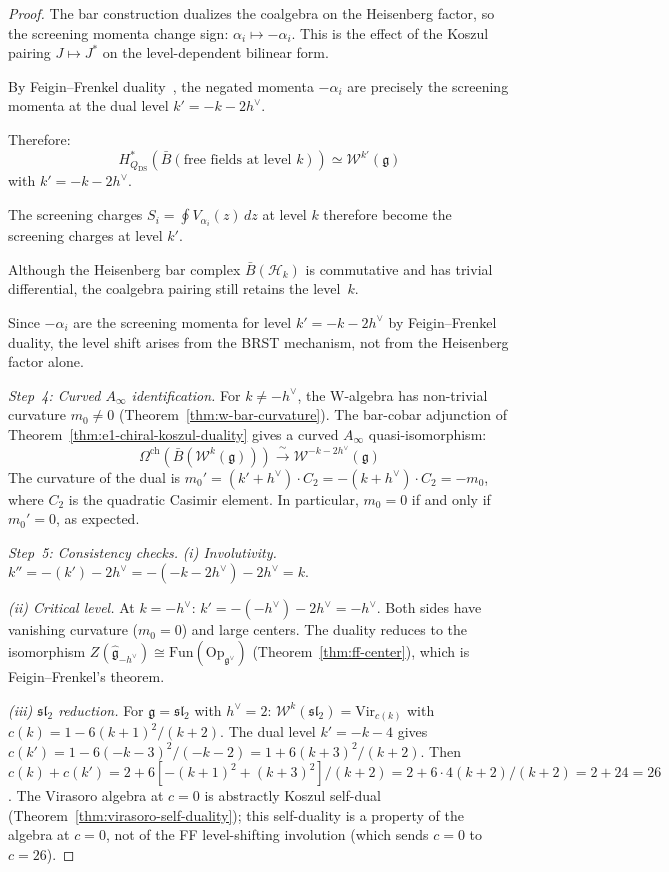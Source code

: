 \begin{proof}
The bar construction dualizes the coalgebra on the Heisenberg factor,
so the screening momenta change sign:
$\alpha_i \mapsto -\alpha_i$.
This is the effect of the Koszul pairing
$J \mapsto J^*$ on the level-dependent bilinear form.

By Feigin--Frenkel duality~\cite{Feigin-Frenkel}, the negated momenta
$-\alpha_i$ are precisely the screening momenta at the dual level
$k' = -k - 2h^\vee$.

Therefore:
\[
H^*_{Q_{\mathrm{DS}}}(\bar{B}(\text{free fields at level } k)) \simeq \mathcal{W}^{k'}(\mathfrak{g})
\]
with $k' = -k - 2h^\vee$.

The screening charges $S_i = \oint V_{\alpha_i}(z)\,dz$ at level $k$
therefore become the screening charges at level $k'$.

Although the Heisenberg bar complex $\bar{B}(\mathcal{H}_k)$ is
commutative and has trivial differential, the coalgebra pairing still
retains the level~$k$.

Since $-\alpha_i$ are the screening momenta for level
$k' = -k-2h^\vee$ by Feigin--Frenkel duality, the level shift arises
from the BRST mechanism, not from the Heisenberg factor alone.

\emph{Step~4: Curved $A_\infty$ identification.}
For $k \neq -h^\vee$, the W-algebra has non-trivial curvature $m_0 \neq 0$ (Theorem~\ref{thm:w-bar-curvature}). The bar-cobar adjunction of Theorem~\ref{thm:e1-chiral-koszul-duality} gives a curved $A_\infty$ quasi-isomorphism:
\[
\Omega^{\mathrm{ch}}(\bar{B}(\mathcal{W}^k(\mathfrak{g}))) \xrightarrow{\;\sim\;} \mathcal{W}^{-k-2h^\vee}(\mathfrak{g})
\]
The curvature of the dual is $m_0' = (k' + h^\vee) \cdot C_2 = -(k + h^\vee) \cdot C_2 = -m_0$, where $C_2$ is the quadratic Casimir element.  In particular, $m_0 = 0$ if and only if $m_0' = 0$, as expected.

\emph{Step~5: Consistency checks.}
\emph{(i) Involutivity.}  $k'' = -(k') - 2h^\vee = -(-k-2h^\vee) - 2h^\vee = k$. \checkmark

\emph{(ii) Critical level.}  At $k = -h^\vee$: $k' = -(-h^\vee) - 2h^\vee = -h^\vee$. Both sides have vanishing curvature ($m_0 = 0$) and large centers.  The duality reduces to the isomorphism $Z(\widehat{\mathfrak{g}}_{-h^\vee}) \cong \mathrm{Fun}(\mathrm{Op}_{\mathfrak{g}^\vee})$ (Theorem~\ref{thm:ff-center}), which is Feigin--Frenkel's theorem. \checkmark

\emph{(iii) $\mathfrak{sl}_2$ reduction.}  For $\mathfrak{g} = \mathfrak{sl}_2$ with $h^\vee = 2$: $\mathcal{W}^k(\mathfrak{sl}_2) = \mathrm{Vir}_{c(k)}$ with $c(k) = 1 - 6(k+1)^2/(k+2)$.  The dual level $k' = -k-4$ gives $c(k') = 1 - 6(-k-3)^2/(-k-2) = 1 + 6(k+3)^2/(k+2)$.  Then $c(k) + c(k') = 2 + 6[-(k+1)^2 + (k+3)^2]/(k+2) = 2 + 6 \cdot 4(k+2)/(k+2) = 2 + 24 = 26$.  The Virasoro algebra at $c = 0$ is abstractly Koszul self-dual (Theorem~\ref{thm:virasoro-self-duality}); this self-duality is a property of the algebra at $c=0$, not of the FF level-shifting involution (which sends $c=0$ to $c=26$). \checkmark


\end{proof}
